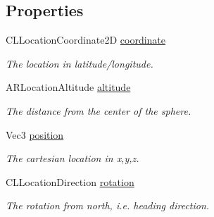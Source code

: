 \subsection*{Properties}
\begin{DoxyCompactItemize}
\item 
\hypertarget{interface_a_r_world_location_a6d1e3dc13b380e19d858252644fbb748}{C\-L\-Location\-Coordinate2\-D \hyperlink{interface_a_r_world_location_a6d1e3dc13b380e19d858252644fbb748}{coordinate}}\label{interface_a_r_world_location_a6d1e3dc13b380e19d858252644fbb748}

\begin{DoxyCompactList}\small\item\em The location in latitude/longitude. \end{DoxyCompactList}\item 
\hypertarget{interface_a_r_world_location_a6198b09685a4bd2b0b76d349322a0774}{A\-R\-Location\-Altitude \hyperlink{interface_a_r_world_location_a6198b09685a4bd2b0b76d349322a0774}{altitude}}\label{interface_a_r_world_location_a6198b09685a4bd2b0b76d349322a0774}

\begin{DoxyCompactList}\small\item\em The distance from the center of the sphere. \end{DoxyCompactList}\item 
\hypertarget{interface_a_r_world_location_a51ba96d39c18d08b5fc9df1d30c99bb8}{Vec3 \hyperlink{interface_a_r_world_location_a51ba96d39c18d08b5fc9df1d30c99bb8}{position}}\label{interface_a_r_world_location_a51ba96d39c18d08b5fc9df1d30c99bb8}

\begin{DoxyCompactList}\small\item\em The cartesian location in x,y,z. \end{DoxyCompactList}\item 
\hypertarget{interface_a_r_world_location_a5dfb74c41931243ea3a618029d4a4760}{C\-L\-Location\-Direction \hyperlink{interface_a_r_world_location_a5dfb74c41931243ea3a618029d4a4760}{rotation}}\label{interface_a_r_world_location_a5dfb74c41931243ea3a618029d4a4760}

\begin{DoxyCompactList}\small\item\em The rotation from north, i.\-e. heading direction. \end{DoxyCompactList}\end{DoxyCompactItemize}


